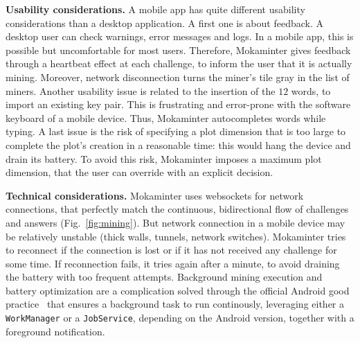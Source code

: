 \vspace{0.5ex}\noindent\textbf{Usability considerations.}
%
A mobile app has quite different usability considerations than a desktop application.
A first one is about feedback.
A desktop user can check warnings, error messages and logs.
In a mobile app, this is possible
but uncomfortable for most users. Therefore, Mokaminter gives feedback through
a heartbeat effect at each challenge, to inform the user that it is
actually mining. Moreover, network disconnection
turns the miner's tile gray in the list of miners.
%
Another usability issue is related to the insertion of the
$12$ words, to import an existing key pair.
This is frustrating and error-prone with the software keyboard of a mobile device.
Thus, Mokaminter autocompletes words while typing.
%
A last issue is the risk of specifying a plot dimension that is
too large to complete the plot's creation in a reasonable time:
this would hang the device and drain its battery. To avoid this risk,
Mokaminter imposes a maximum plot dimension, that the user can override
with an explicit decision.

\vspace{0.5ex}\noindent\textbf{Technical considerations.}
%
Mokaminter uses websockets for network connections,
that perfectly match the continuous, bidirectional flow of challenges
and answers (Fig.~\ref{fig:mining}). But network connection in a
mobile device may be relatively unstable (thick walls, tunnels, network switches).
Mokaminter tries to reconnect if the connection is lost or
if it has not received any challenge for some time. If reconnection fails, it
tries again after a minute, to avoid draining the battery with too
frequent attempts. Background mining execution and battery optimization
are a complication solved through the official
Android good practice~\cite{background-tasks}
that ensures a background task to run continously,
leveraging either a \texttt{WorkManager} or a \texttt{JobService}, depending on the
Android version, together with a foreground notification.
%

